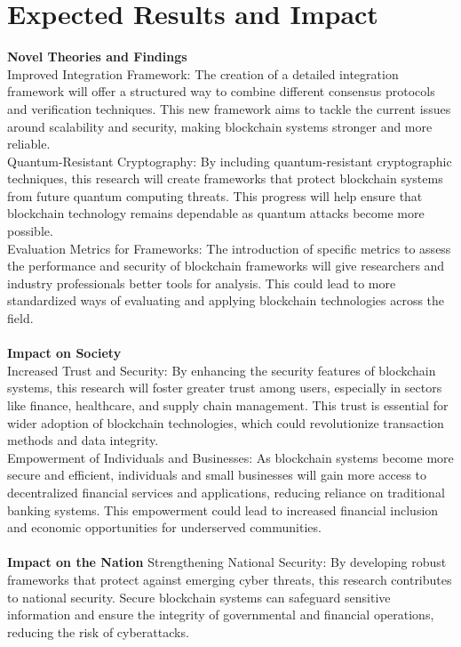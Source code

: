 \documentclass[a4paper, 12pt]{article}
\begin{document}
\section{Expected Results and Impact}
\textbf{Novel Theories and Findings}
\\
Improved Integration Framework: The creation of a detailed integration framework will offer a structured way to combine different consensus protocols and verification techniques. This new framework aims to tackle the current issues around scalability and security, making blockchain systems stronger and more reliable.
\\
Quantum-Resistant Cryptography: By including quantum-resistant cryptographic techniques, this research will create frameworks that protect blockchain systems from future quantum computing threats. This progress will help ensure that blockchain technology remains dependable as quantum attacks become more possible.
\\
Evaluation Metrics for Frameworks: The introduction of specific metrics to assess the performance and security of blockchain frameworks will give researchers and industry professionals better tools for analysis. This could lead to more standardized ways of evaluating and applying blockchain technologies across the field.
\\
\\
\textbf{Impact on Society}
\\
Increased Trust and Security: By enhancing the security features of blockchain systems, this research will foster greater trust among users, especially in sectors like finance, healthcare, and supply chain management. This trust is essential for wider adoption of blockchain technologies, which could revolutionize transaction methods and data integrity.
\\
Empowerment of Individuals and Businesses: As blockchain systems become more secure and efficient, individuals and small businesses will gain more access to decentralized financial services and applications, reducing reliance on traditional banking systems. This empowerment could lead to increased financial inclusion and economic opportunities for underserved communities.
\\
\\
 \textbf{Impact on the Nation}
Strengthening National Security: By developing robust frameworks that protect against emerging cyber threats, this research contributes to national security. Secure blockchain systems can safeguard sensitive information and ensure the integrity of governmental and financial operations, reducing the risk of cyberattacks.
\end{document}
